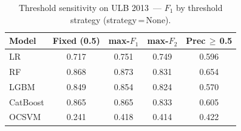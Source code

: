 \begin{table}[ht]
\centering
\caption{Threshold sensitivity on ULB 2013~--- $F_1$ by threshold strategy (strategy\,=\,None).}
\label{tab:threshold_ulb_f1}
\begin{tabular}{l c c c c}
\toprule
Model & Fixed (0.5) & max-$F_1$ & max-$F_2$ & Prec\,$\geq$\,0.5 \\
\midrule
LR         & 0.717 & 0.751 & 0.749 & 0.596 \\
RF         & 0.868 & 0.873 & 0.831 & 0.654 \\
LGBM       & 0.849 & 0.854 & 0.824 & 0.570 \\
CatBoost   & 0.865 & 0.865 & 0.833 & 0.605 \\
OCSVM      & 0.241 & 0.418 & 0.414 & 0.422 \\
\bottomrule
\end{tabular}
\end{table}